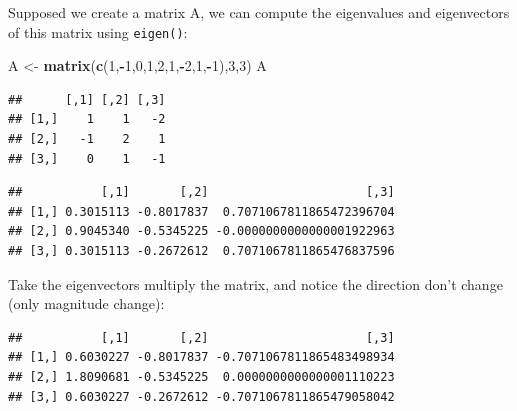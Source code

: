 \documentclass[]{article}
\newenvironment{Shaded}{\begin{snugshade}}{\end{snugshade}}
\newcommand{\DecValTok}[1]{\textcolor[rgb]{0.00,0.00,0.81}{#1}}
\newcommand{\KeywordTok}[1]{\textcolor[rgb]{0.13,0.29,0.53}{\textbf{#1}}}
\newcommand{\NormalTok}[1]{#1}
\newcommand{\OperatorTok}[1]{\textcolor[rgb]{0.81,0.36,0.00}{\textbf{#1}}}
\newcommand{\StringTok}[1]{\textcolor[rgb]{0.31,0.60,0.02}{#1}}
\begin{document}
Supposed we create a matrix A, we can compute the eigenvalues and
eigenvectors of this matrix using \texttt{eigen()}:

\begin{Shaded}
\begin{Highlighting}[]
\NormalTok{A <-}\StringTok{ }\KeywordTok{matrix}\NormalTok{(}\KeywordTok{c}\NormalTok{(}\DecValTok{1}\NormalTok{,}\OperatorTok{-}\DecValTok{1}\NormalTok{,}\DecValTok{0}\NormalTok{,}\DecValTok{1}\NormalTok{,}\DecValTok{2}\NormalTok{,}\DecValTok{1}\NormalTok{,}\OperatorTok{-}\DecValTok{2}\NormalTok{,}\DecValTok{1}\NormalTok{,}\OperatorTok{-}\DecValTok{1}\NormalTok{),}\DecValTok{3}\NormalTok{,}\DecValTok{3}\NormalTok{)}
\NormalTok{A}
\end{Highlighting}
\end{Shaded}

\begin{verbatim}
##      [,1] [,2] [,3]
## [1,]    1    1   -2
## [2,]   -1    2    1
## [3,]    0    1   -1
\end{verbatim}

\begin{Shaded}
\end{Shaded}

\begin{verbatim}
##           [,1]       [,2]                      [,3]
## [1,] 0.3015113 -0.8017837  0.7071067811865472396704
## [2,] 0.9045340 -0.5345225 -0.0000000000000001922963
## [3,] 0.3015113 -0.2672612  0.7071067811865476837596
\end{verbatim}

Take the eigenvectors multiply the matrix, and notice the direction
don't change (only magnitude change):

\begin{Shaded}
\end{Shaded}

\begin{verbatim}
##           [,1]       [,2]                      [,3]
## [1,] 0.6030227 -0.8017837 -0.7071067811865483498934
## [2,] 1.8090681 -0.5345225  0.0000000000000001110223
## [3,] 0.6030227 -0.2672612 -0.7071067811865479058042
\end{verbatim}
\end{document}
